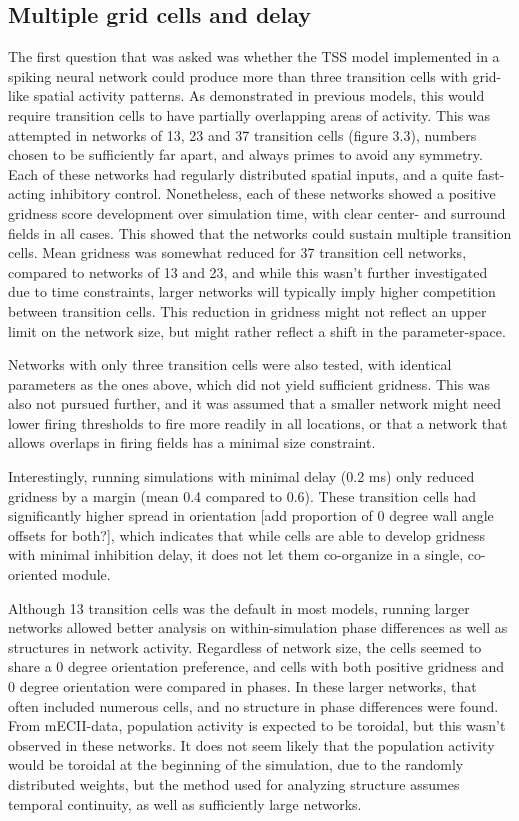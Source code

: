 \documentclass{article}
\begin{document}
    \subsection{Multiple grid cells and delay}
    The first question that was asked was whether the TSS model implemented in a spiking neural network could produce more than three transition cells with grid-like spatial activity patterns. As demonstrated in previous models, this would require transition cells to have partially overlapping areas of activity. This was attempted in networks of 13, 23 and 37 transition cells (figure 3.3), numbers chosen to be sufficiently far apart, and always primes to avoid any symmetry. Each of these networks had regularly distributed spatial inputs, and a quite fast-acting inhibitory control. Nonetheless, each of these networks showed a positive gridness score development over simulation time, with clear center- and surround fields in all cases. This showed that the networks could sustain multiple transition cells. Mean gridness was somewhat reduced for 37 transition cell networks, compared to networks of 13 and 23, and while this wasn't further investigated due to time constraints, larger networks will typically imply higher competition between transition cells. This reduction in gridness might not reflect an upper limit on the network size, but might rather reflect a shift in the parameter-space. 

    Networks with only three transition cells were also tested, with identical parameters as the ones above, which did not yield sufficient gridness. This was also not pursued further, and it was assumed that a smaller network might need lower firing thresholds to fire more readily in all locations, or that a network that allows overlaps in firing fields has a minimal size constraint.
    
    Interestingly, running simulations with minimal delay (0.2 ms) only reduced gridness by a margin (mean 0.4 compared to 0.6). These transition cells had significantly higher spread in orientation [add proportion of 0 degree wall angle offsets for both?], which indicates that while cells are able to develop gridness with minimal inhibition delay, it does not let them co-organize in a single, co-oriented module.

    Although 13 transition cells was the default in most models, running larger networks allowed better analysis on within-simulation phase differences as well as structures in network activity. Regardless of network size, the cells seemed to share a 0 degree orientation preference, and cells with both positive gridness and 0 degree orientation were compared in phases. In these larger networks, that often included numerous cells, and no structure in phase differences were found. From mECII-data, population activity is expected to be toroidal, but this wasn't observed in these networks. It does not seem likely that the population activity would be toroidal at the beginning of the simulation, due to the randomly distributed weights, but the method used for analyzing structure assumes temporal continuity, as well as sufficiently large networks.
\end{document}
